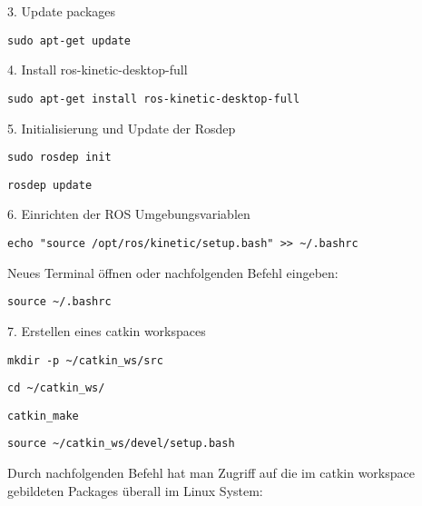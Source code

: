 3. Update packages

\begin{lstlisting}
sudo apt-get update
\end{lstlisting}

4. Install ros-kinetic-desktop-full


\begin{lstlisting}
sudo apt-get install ros-kinetic-desktop-full
\end{lstlisting}

5. Initialisierung und Update der Rosdep

\begin{lstlisting}
sudo rosdep init
\end{lstlisting}

\begin{lstlisting}
rosdep update
\end{lstlisting}

6. Einrichten der ROS Umgebungsvariablen

\begin{lstlisting}
echo "source /opt/ros/kinetic/setup.bash" >> ~/.bashrc
\end{lstlisting}

Neues Terminal öffnen oder nachfolgenden Befehl eingeben:

\begin{lstlisting}
source ~/.bashrc
\end{lstlisting}

7. Erstellen eines catkin workspaces 

\begin{lstlisting}
mkdir -p ~/catkin_ws/src
\end{lstlisting}

\begin{lstlisting}
cd ~/catkin_ws/
\end{lstlisting}

\begin{lstlisting}
catkin_make
\end{lstlisting}

\begin{lstlisting}
source ~/catkin_ws/devel/setup.bash
\end{lstlisting}

Durch nachfolgenden Befehl hat man Zugriff auf die im catkin workspace gebildeten Packages überall im Linux System: 


